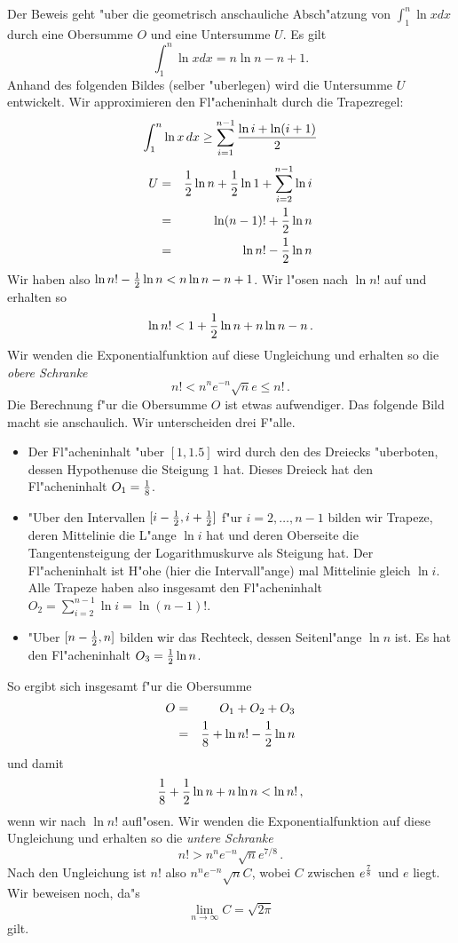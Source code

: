 \documentclass[10pt]{article}
\begin{document}
Der Beweis geht "uber die geometrisch anschauliche Absch"atzung 
von $\int_1^n \ln x dx$ durch eine Obersumme $O$ und eine Untersumme $U$. 
Es gilt
$$
  \int_{1}^n \ln x dx = n\ln n - n + 1.
$$
Anhand des folgenden Bildes (selber "uberlegen) wird die Untersumme $U$ 
entwickelt. Wir approximieren den Fl"acheninhalt durch die Trapezregel:
$$
  \int_1^n \ln x\, dx \ge \sum_{i=1}^{n-1} {\ln i + \ln(i+1)\over 2}
$$
\begin{eqnarray*}
  U & = & {1\over 2}\ln n + {1\over 2}\ln 1 + \sum_{i=2}^{n-1}\ln i \\
    & = & \ln(n-1)! + {1\over 2}\ln n \\
    & = & \ln n! - {1\over 2}\ln n
\end{eqnarray*}
Wir haben also $\ln n! - {1\over 2}\ln n < n\ln n - n + 1$. Wir l"osen nach
$\ln n!$ auf und erhalten so
$$ \ln n! < 1+{1\over 2}\ln n + n\ln n - n \, . $$
Wir wenden die Exponentialfunktion auf diese Ungleichung und erhalten so die
\emph{obere Schranke}
$$
  n! < n^n e^{-n} \sqrt{n} e \le n! \, .
$$
Die Berechnung f"ur die Obersumme $O$ ist etwas aufwendiger. Das folgende
Bild macht sie anschaulich.
Wir unterscheiden drei F"alle.
\begin{itemize}
  \item Der Fl"acheninhalt "uber $[1,1.5]$ wird durch den des Dreiecks
    "uberboten, dessen Hypothenuse die Steigung $1$ hat. Dieses Dreieck
    hat den Fl"acheninhalt $O_1={1\over 8}$.
  \item "Uber den Intervallen $[i-{1\over 2}, i+{1\over 2}]$ f"ur 
    $i=2,\ldots,n-1$ bilden wir Trapeze, deren Mittelinie die
    L"ange $\ln i$ hat und deren Oberseite die Tangentensteigung der
    Logarithmuskurve als Steigung hat. Der Fl"acheninhalt ist
    H"ohe (hier die Intervall"ange) mal Mittelinie gleich $\ln i$. 
    Alle Trapeze haben also insgesamt den Fl"acheninhalt
    $O_2 = \sum_{i=2}^{n-1}\ln i = \ln(n-1)!$.
  \item "Uber $[n-{1\over 2},n]$ bilden wir das Rechteck, dessen Seitenl"ange
    $\ln n$ ist. Es hat den Fl"acheninhalt $O_3={1\over 2}\ln n$.
\end{itemize}
So ergibt sich insgesamt f"ur die Obersumme 
\begin{eqnarray*}
  O & = & O_1 + O_2 + O_3 \\
    & = & {1\over 8} + \ln n! - {1\over 2}\ln n
\end{eqnarray*}
und damit 
$$
  {1\over 8} + {1\over 2}\ln n + n\ln n < \ln n! \, ,
$$
wenn wir nach $\ln n!$ aufl"osen. Wir wenden die Exponentialfunktion auf diese
Ungleichung und erhalten so die \emph{untere Schranke}
$$
  n! > n^n e^{-n} \sqrt{n} e^{7/8} \, .
$$
Nach den Ungleichung ist $n!$ also $n^n e^{-n} \sqrt{n} C$, wobei $C$
zwischen $e^{{7\over 8}}$ und $e$ liegt. Wir beweisen noch, da"s
$$ \lim_{n\rightarrow\infty} C = \sqrt{2\pi} $$
gilt.
\end{document}
